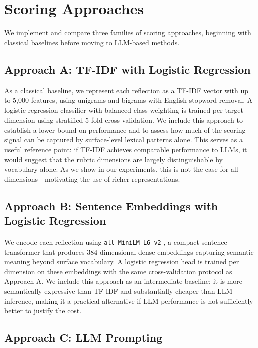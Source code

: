 \documentclass[11pt]{article}
\begin{document}
\section{Scoring Approaches}

We implement and compare three families of scoring approaches, beginning with classical baselines before moving to LLM-based methods.

\subsection{Approach A: TF-IDF with Logistic Regression}

As a classical baseline, we represent each reflection as a TF-IDF vector with up to 5{,}000 features, using unigrams and bigrams with English stopword removal. A logistic regression classifier with balanced class weighting is trained per target dimension using stratified 5-fold cross-validation. We include this approach to establish a lower bound on performance and to assess how much of the scoring signal can be captured by surface-level lexical patterns alone. This serves as a useful reference point: if TF-IDF achieves comparable performance to LLMs, it would suggest that the rubric dimensions are largely distinguishable by vocabulary alone. As we show in our experiments, this is not the case for all dimensions—motivating the use of richer representations.

\subsection{Approach B: Sentence Embeddings with Logistic Regression}

We encode each reflection using \texttt{all-MiniLM-L6-v2} \citep{reimers2019sentence}, a compact sentence transformer that produces 384-dimensional dense embeddings capturing semantic meaning beyond surface vocabulary. A logistic regression head is trained per dimension on these embeddings with the same cross-validation protocol as Approach A. We include this approach as an intermediate baseline: it is more semantically expressive than TF-IDF and substantially cheaper than LLM inference, making it a practical alternative if LLM performance is not sufficiently better to justify the cost.

\subsection{Approach C: LLM Prompting}
\end{document}
